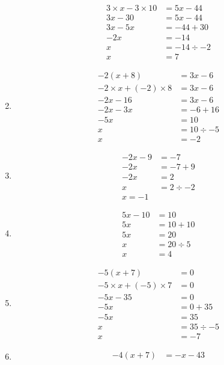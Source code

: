 \documentclass[11pt]{article}
\begin{document}
\begin{multicols}{3}
\begin{enumerate}
\begin{align*}
       3 \times x - 3 \times 10 &= 5x - 44 \\
       3x - 30 &= 5x - 44\\
       3x - 5x &= -44  + 30 \\
       -2x &= -14 \\
       x &= -14 \div -2\\
       x &= 7  
    \end{align*}
    \item
    \begin{align*}
       -2(x + 8) &= 3x - 6 \\
       -2 \times x + (-2) \times 8 &= 3x - 6 \\
       -2x - 16 &= 3x - 6\\
       -2x - 3x &= -6  + 16 \\
       -5x &= 10 \\
       x &= 10 \div -5\\
       x &= -2  
    \end{align*}
    \item
    \begin{align*}
       -2x - 9 &= -7  \\
       -2x &= -7 + 9 \\
       -2x &= 2  \\
        x &= 2 \div -2 \\
        x = -1
    \end{align*}
    \item
    \begin{align*}
       5x - 10 &= 10 \\
       5x &= 10 + 10  \\
       5x &= 20  \\
       x &= 20 \div 5 \\
       x &= 4
    \end{align*}
    \item
    \begin{align*}
       -5(x + 7) &= 0 \\
       -5 \times x + (-5) \times 7 &= 0 \\
       -5x - 35 &= 0\\
       -5x &= 0 + 35 \\
       -5x &= 35 \\
       x &= 35 \div -5\\
       x &= -7    
    \end{align*}
    \item
    \begin{align*}
       -4(x + 7) &= -x - 43 \\

\end{align*}
\end{enumerate}
\end{multicols}
\end{document}
